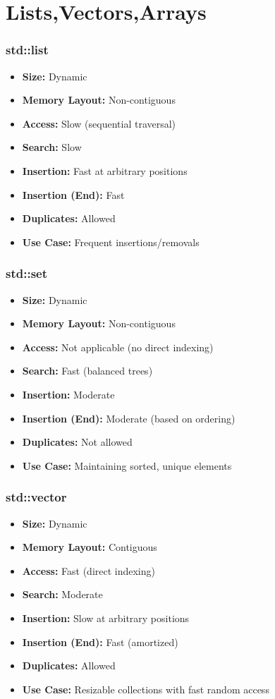 \section{Lists,Vectors,Arrays}
\subsubsection{std::list}
\begin{itemize}[leftmargin=1.5cm]
    \item \textbf{Size:} Dynamic
    \item \textbf{Memory Layout:} Non-contiguous
    \item \textbf{Access:} Slow (sequential traversal)
    \item \textbf{Search:} Slow
    \item \textbf{Insertion:} Fast at arbitrary positions
    \item \textbf{Insertion (End):} Fast
    \item \textbf{Duplicates:} Allowed
    \item \textbf{Use Case:} Frequent insertions/removals
\end{itemize}

\subsubsection{std::set}
\begin{itemize}[leftmargin=1.5cm]
    \item \textbf{Size:} Dynamic
    \item \textbf{Memory Layout:} Non-contiguous
    \item \textbf{Access:} Not applicable (no direct indexing)
    \item \textbf{Search:} Fast (balanced trees)
    \item \textbf{Insertion:} Moderate
    \item \textbf{Insertion (End):} Moderate (based on ordering)
    \item \textbf{Duplicates:} Not allowed
    \item \textbf{Use Case:} Maintaining sorted, unique elements
\end{itemize}

\subsubsection{std::vector}
\begin{itemize}[leftmargin=1.5cm]
    \item \textbf{Size:} Dynamic
    \item \textbf{Memory Layout:} Contiguous
    \item \textbf{Access:} Fast (direct indexing)
    \item \textbf{Search:} Moderate
    \item \textbf{Insertion:} Slow at arbitrary positions
    \item \textbf{Insertion (End):} Fast (amortized)
    \item \textbf{Duplicates:} Allowed
    \item \textbf{Use Case:} Resizable collections with fast random access
\end{itemize}

